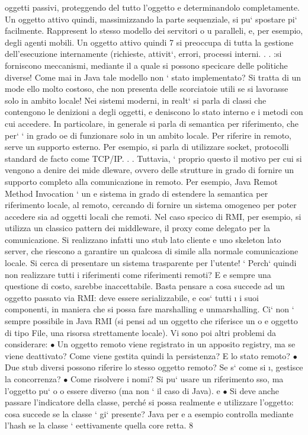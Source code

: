 \documentclass[a4paper,12pt]{article}
\begin{document}
oggetti passivi, proteggendo del tutto l'oggetto e determinandolo completamente. Un oggetto attivo quindi, massimizzando
la parte sequenziale,
si pu` spostare pi` facilmente. Rappresent lo stesso modello dei servitori
o
u
paralleli, e, per esempio, degli agenti mobili. Un oggetto attivo quindi
7
si preoccupa di tutta la gestione dell'esecuzione internamente (richieste,
attivit`, errori, processi interni. . . :si forniscono meccanismi, mediante il
a
quale si possono specicare delle politiche diverse!
Come mai in Java tale modello non ` stato implementato? Si tratta di un mode
ello molto costoso, che non presenta delle scorciatoie utili se si lavorasse solo in
ambito locale!
Nei sistemi moderni, in realt` si parla di classi che contengono le denizioni
a
degli oggetti, e deniscono lo stato interno e i metodi con cui accedere. In particolare, in generale si parla di
semantica per riferimento, che per` ` in grado
oe
di funzionare solo in un ambito locale. Per riferire in remoto, serve un supporto
esterno. Per esempio, si parla di utilizzare socket, protocolli standard de facto
come TCP/IP. . .
Tuttavia, ` proprio questo il motivo per cui si vengono a denire dei mide
dleware, ovvero delle strutture in grado di fornire un supporto completo alla
comunicazione in remoto. Per esempio, Java Remot Method Invocation ` un
e
sistema in grado di estendere la semantica per riferimento locale, al remoto,
cercando di fornire un sistema omogeneo per poter accedere sia ad oggetti locali
che remoti. Nel caso specico di RMI, per esempio, si utilizza un classico pattern dei middleware, il proxy come delegato
per la comunicazione. Si realizzano
infatti uno stub lato cliente e uno skeleton lato server, che riescono a garantire
un qualcosa di simile alla normale comunicazione locale. Si cerca di presentare
un sistema trasparente per l'utente!
`
Perch` quindi non realizzare tutti i riferimenti come riferimenti remoti? E
e
sempre una questione di costo, sarebbe inaccettabile. Basta pensare a cosa
succede ad un oggetto passato via RMI: deve essere serializzabile, e cos` tutti
\i{}
i suoi componenti, in maniera che si possa fare marshalling e unmarshalling.
Ci` non ` sempre possibile in Java RMI (si pensi ad un oggetto che riferisce un
o
e
oggetto di tipo File, una risorsa strettamente locale). Vi sono poi altri problemi
da considerare:
$\bullet$ Un oggetto remoto viene registrato in un apposito registry, ma se viene
deattivato? Come viene gestita quindi la persistenza? E lo stato remoto?
$\bullet$ Due stub diversi possono riferire lo stesso oggetto remoto? Se s` come si
\i{},
gestisce la concorrenza?
$\bullet$ Come risolvere i nomi? Si pu` usare un riferimento sso, ma l'oggetto pu`
o
o
essere diverso (ma non ` il caso di Java).
e
$\bullet$ Si deve anche passare l'indicatore della classe, perché si possa realmente
e
utilizzare l'oggetto: cosa succede se la classe ` gi` presente? Java per
e a
esempio controlla mediante l'hash se la classe ` eettivamente quella core
retta.
8
\end{document}
